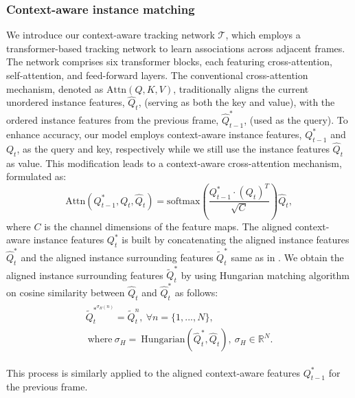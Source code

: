 \documentclass[10pt,twocolumn,letterpaper]{article}
\begin{document}
\subsubsection{Context-aware instance matching}
We introduce our context-aware tracking network $\mathcal{T}$, which employs a transformer-based tracking network \citep{heo2023generalized, DVIS} to learn associations across adjacent frames. The network comprises six transformer blocks, each featuring cross-attention, self-attention, and feed-forward layers.
The conventional cross-attention mechanism, denoted as $\text{Attn}(Q, K, V)$, traditionally aligns the current unordered instance features, $\hat{Q}_{t}$, (serving as both the key and value), with the ordered instance features from the previous frame, $\hat{Q}^{*}_{t-1}$, (used as the query). 
To enhance accuracy, our model employs context-aware instance features, ${Q}^*_{t-1}$ and ${Q}_{t}$, as the query and key, respectively while we still use the instance features $\hat{Q}_t$ as value. 
This modification leads to a context-aware cross-attention mechanism, formulated as:
\begin{equation}
\label{eq:cross_attn}
\text{Attn}({Q}_{t-1}^*, {Q}_{t}, \hat{Q}_{t}) = \text{softmax} \left( \frac{{Q}_{t-1}^* \cdot \left( {Q}_{t} \right)^T }{\sqrt{C}} \right) \hat{Q}_{t},
\end{equation}
where $C$ is the channel dimensions of the feature maps.
The aligned context-aware instance features $Q_{t}^{*}$ is built by concatenating the aligned instance features $\hat{Q}_{t}^{*}$ and the aligned instance surrounding features $\tilde{Q}_{t}^*$ same as in .
We obtain the aligned instance surrounding features $\tilde{Q}_{t}^*$ by using Hungarian matching algorithm \citep{kuhn1955hungarian} on cosine similarity between $\hat{Q}_{t}$ and $\hat{Q}_{t}^{*}$ as follows:
\begin{align}
\begin{gathered}
\tilde{Q}_{t}^{*^{\sigma_H(n)}} = \tilde{Q}_{t}^n,~\forall n =\{1,...,N\}, \\
~\text{where}~ \sigma_H = ~\text{Hungarian}(\hat{Q}_{t}^{*},\hat{Q}_{t}),~\sigma_H \in \mathbb{R}^N.
\end{gathered}
\end{align}

This process is similarly applied to the aligned context-aware features $Q_{t-1}^{*}$ for the previous frame.




\end{document}
